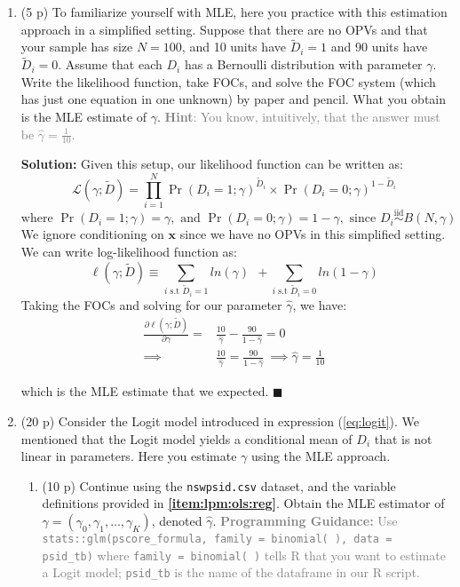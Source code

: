 \documentclass[
]{article}
\begin{document}
\begin{enumerate}
\def\labelenumi{\arabic{enumi}.}
\setcounter{enumi}{3}
\item
  (5 p) To familiarize yourself with MLE, here you practice with this
  estimation approach in a simplified setting. Suppose that there are no
  OPVs and that your sample has size \(N=100\), and 10 units have
  \(\tilde{D}_i=1\) and 90 units have \(\tilde{D}_i=0\). Assume that
  each \(D_i\) has a Bernoulli distribution with parameter \(\gamma\).
  Write the likelihood function, take FOCs, and solve the FOC system
  (which has just one equation in one unknown) by paper and pencil. What
  you obtain is the MLE estimate of \(\gamma\).
  \textcolor{gray}{\textbf{Hint}: You know, intuitively, that the answer must be $\hat{\gamma}=\frac{1}{10}$.}

  \textbf{Solution:} Given this setup, our likelihood function can be
  written as: \[
           \mathcal{L}(\gamma; \tilde{D}) = \prod_{i=1}^{N}\Pr(D_i=1; \gamma)^{\tilde{D}_i}\times \Pr(D_i=0; \gamma)^{1-\tilde{D}_i}
       \] \[
           \text{where } \Pr(D_i=1; \gamma) = \gamma, \text{ and } \Pr(D_i=0; \gamma) = 1 - \gamma, \text{ since } D_i \overset{\mathrm{iid}}{\sim} B(N, \gamma)
       \] We ignore conditioning on \(\mathbf{x}\) since we have no OPVs
  in this simplified setting. We can write log-likelihood function as:
  \[
           \ell(\gamma; \tilde{D}) \equiv \sum_{i \text{ s.t } \tilde{D}_i = 1} ln(\gamma) \ \ + \sum_{i \text{ s.t } \tilde{D}_i = 0} ln(1 - \gamma)
       \] Taking the FOCs and solving for our parameter
  \(\hat{\gamma}\), we have: \begin{align*}
           \frac{\partial \ell(\gamma; \tilde{D})}{\partial \gamma} = & \frac{10}{\hat{\gamma}} - \frac{90}{1 - \hat{\gamma}} = 0 \\
           \implies &\frac{10}{\hat{\gamma}} = \frac{90}{1 - \hat{\gamma}} \ \implies \hat{\gamma} = \frac{1}{10}
       \end{align*}

  which is the MLE estimate that we expected. \hfill \(\blacksquare\)
\item
  (20 p) Consider the Logit model introduced in expression
  (\ref{eq:logit}). We mentioned that the Logit model yields a
  conditional mean of \(D_i\) that is not linear in parameters. Here you
  estimate \(\gamma\) using the MLE approach.

  \begin{enumerate}
  \def\labelenumii{\alph{enumii}.}
  \item
    (10 p) Continue using the \texttt{nswpsid.csv} dataset, and the
    variable definitions provided in \textbf{\ref{item:lpm:ols:reg}}.
    Obtain the MLE estimator of
    \(\gamma= (\gamma_0,\gamma_1,\dots,\gamma_K)\), denoted
    \(\hat{\gamma}\).
    \textcolor{gray}{\textbf{Programming Guidance:} Use \\ \texttt{stats::glm(pscore\_formula, family = binomial( ), data = psid\_tb)} where \texttt{family = binomial( )} tells R that you want to estimate a Logit model; \texttt{psid\_tb} is the name of the dataframe in our R script.}\label{item:logit:reg}
    \newpage


\end{enumerate}
\end{enumerate}
\end{document}
